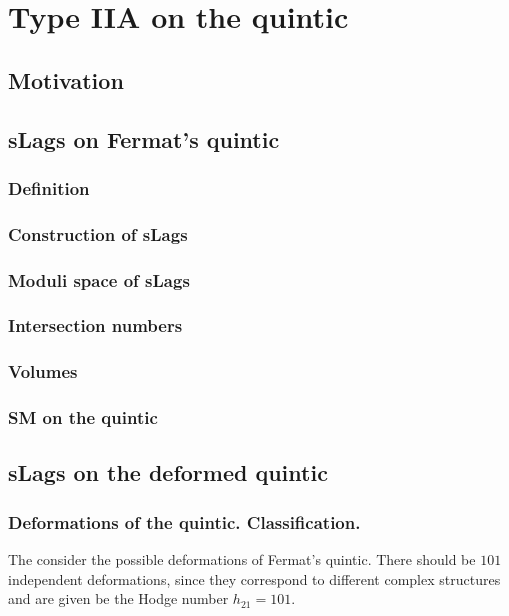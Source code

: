 \chapter{Type IIA on the quintic}

\section{Motivation}



\section{sLags on Fermat's quintic}

\subsection{Definition}

\subsection{Construction of sLags}

\subsection{Moduli space of sLags}

\subsection{Intersection numbers}

\subsection{Volumes}

\subsection{SM on the quintic}

\section{sLags on the deformed quintic}

\subsection{Deformations of the quintic. Classification.}
The consider the possible deformations of Fermat's quintic.
There should be $101$ independent deformations, since they correspond to different complex 
structures and are given be the Hodge number $h_{21}=101$.

